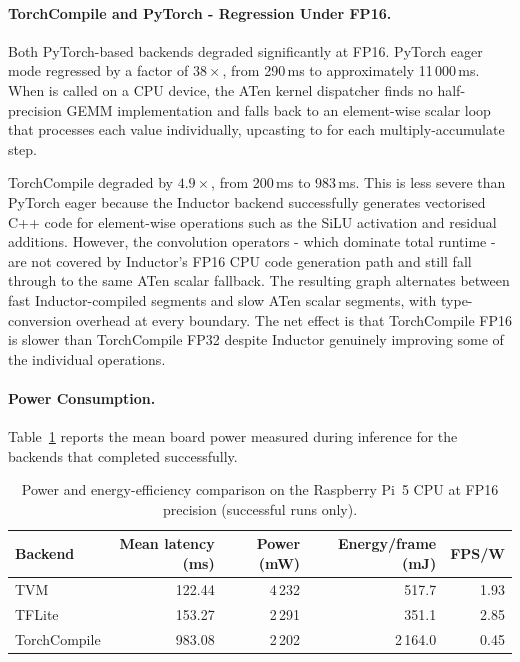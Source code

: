 \documentclass[12pt,a4paper]{report}
\begin{document}
\paragraph{TorchCompile and PyTorch - Regression Under FP16.}
Both PyTorch-based backends degraded significantly at FP16. PyTorch eager mode
regressed by a factor of $38\times$, from 290\,ms to approximately 11\,000\,ms.
When  is called on a CPU device, the ATen kernel dispatcher
finds no half-precision GEMM implementation and falls back to an element-wise
scalar loop that processes each  value individually, upcasting
to  for each multiply-accumulate step.

TorchCompile degraded by $4.9\times$, from 200\,ms to 983\,ms. This is less
severe than PyTorch eager because the Inductor backend successfully generates
vectorised C++ code for element-wise operations such as the SiLU activation and
residual additions. However, the convolution operators - which dominate total
runtime - are not covered by Inductor's FP16 CPU code generation path and still
fall through to the same ATen scalar fallback. The resulting graph alternates
between fast Inductor-compiled segments and slow ATen scalar segments, with
type-conversion overhead at every boundary. The net effect is that TorchCompile
FP16 is slower than TorchCompile FP32 despite Inductor genuinely improving some
of the individual operations.

\paragraph{Power Consumption.}
Table~\ref{tab:pi5_fp16_power} reports the mean board power measured during
inference for the backends that completed successfully.

\begin{table}[ht]
\centering
\caption{Power and energy-efficiency comparison on the Raspberry Pi~5 CPU
         at FP16 precision (successful runs only).}
\label{tab:pi5_fp16_power}
\begin{tabular}{lrrrr}
\toprule
Backend & Mean latency (ms) & Power (mW) & Energy/frame (mJ) & FPS/W \\
\midrule
TVM          & 122.44 & 4\,232 & 517.7 & 1.93 \\
TFLite       & 153.27 & 2\,291 & 351.1 & 2.85 \\
TorchCompile & 983.08 & 2\,202 & 2\,164.0 & 0.45 \\
\bottomrule
\end{tabular}
\end{table}
\end{document}
